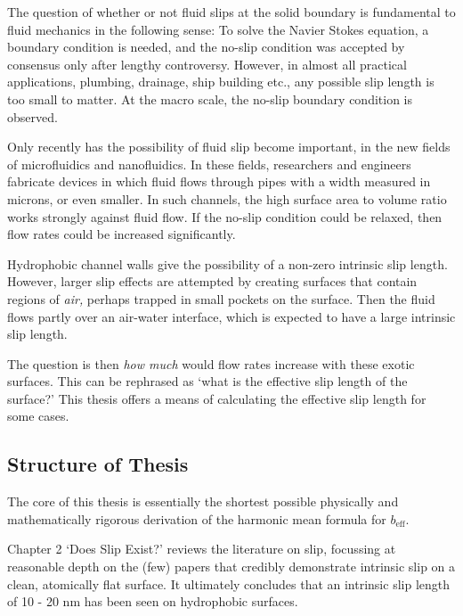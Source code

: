 \documentclass[12pt, a4paper, twoside, openright]{book}
\newcommand{\beff}{\ensuremath{b_{\mathrm{eff}}}}
\begin{document}

The question of whether or not fluid slips at the solid boundary is fundamental to fluid mechanics in the following sense: To solve the Navier Stokes equation, a boundary condition is needed, and the no-slip condition was accepted by consensus only after lengthy controversy.
However, in almost all practical applications, plumbing, drainage, ship building etc., any possible slip length is too small to matter.  At the macro scale, the no-slip boundary condition is observed.

Only recently has the possibility of fluid slip become important, in the new fields of microfluidics and nanofluidics.  In these fields, researchers and engineers fabricate devices in which fluid flows through pipes with a width measured in microns, or even smaller.  In such channels, the high surface area to volume ratio works strongly against fluid flow.  If the no-slip condition could be relaxed, then flow rates could be increased significantly.

Hydrophobic channel walls give the possibility of a non-zero intrinsic slip length.  However, larger slip effects are attempted by creating surfaces that contain regions of \emph{air,} perhaps trapped in small pockets on the surface.  Then the fluid flows partly over an air-water interface, which is expected to have a large intrinsic slip length.

The question is then \emph{how much} would flow rates increase with these exotic surfaces.  This can be rephrased as `what is the effective slip length of the surface?'  This thesis offers a means of calculating the effective slip length for some cases.

\clearpage

\subsection*{Structure of Thesis}

The core of this thesis is essentially the shortest possible physically and mathematically rigorous derivation of the harmonic mean formula for $\beff$.  

Chapter 2 `Does Slip Exist?' reviews the literature on slip, focussing at reasonable depth on the (few) papers that credibly demonstrate intrinsic slip on a clean, atomically flat surface.  It ultimately concludes that an intrinsic slip length of 10 - 20 nm has been seen on hydrophobic surfaces.
\end{document}
